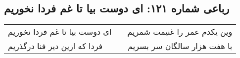 \begin{center}
\section*{رباعی شماره ۱۲۱: ای دوست بیا تا غم فردا نخوریم}
\label{sec:sh121}
\begin{longtable}{l p{0.5cm} r}
ای دوست بیا تا غم فردا نخوریم
&&
وین یکدم عمر را غنیمت شمریم
\\
فردا که ازین دیر فنا درگذریم
&&
با هفت هزار سالگان سر بسریم
\\
\end{longtable}
\end{center}
